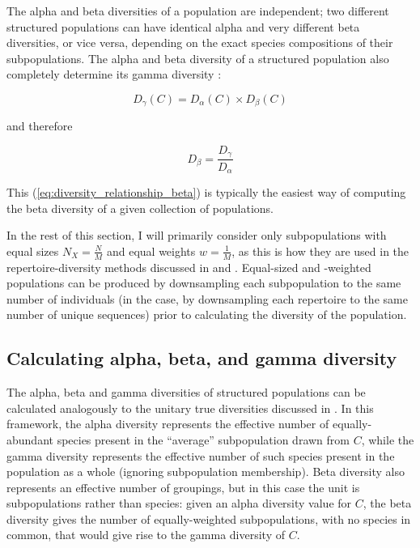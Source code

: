\noindent The alpha and beta diversities of a population are independent; two different structured populations can have identical alpha and very different beta diversities, or vice versa, depending on the exact species compositions of their subpopulations. The alpha and beta diversity of a structured population also completely determine its gamma diversity \citep{jost2007partitioning}:

\begin{equation}
D_\gamma(C) = D_\alpha(C) \times D_\beta(C)
\label{eq:diversity_relationship_gamma}
\end{equation}

\noindent and therefore 

\begin{equation}
D_\beta = \frac{D_\gamma}{D_\alpha}
\label{eq:diversity_relationship_beta}
\end{equation}

\noindent This (\autoref{eq:diversity_relationship_beta}) is typically the easiest way of computing the beta diversity of a given collection of populations.

In the rest of this section, I will primarily consider only subpopulations with equal sizes $N_X = \frac{N}{M}$ and equal weights $w = \frac{1}{M}$, as this is how they are used in the repertoire-diversity methods discussed in  and . Equal-sized and -weighted populations can be produced by downsampling each subpopulation to the same number of individuals (in the \igseq case, by downsampling each repertoire to the same number of unique sequences) prior to calculating the diversity of the population.
 
\subsection{Calculating alpha, beta, and gamma diversity}
\label{app:diversity-structured-calc}

The alpha, beta and gamma diversities of structured populations can be calculated analogously to the unitary true diversities discussed in . In this framework, the alpha diversity represents the effective number of equally-abundant species present in the ``average'' subpopulation drawn from $C$, while the gamma diversity represents the effective number of such species present in the population as a whole (ignoring subpopulation membership). Beta diversity also represents an effective number of groupings, but in this case the unit is subpopulations rather than species: given an alpha diversity value for $C$, the beta diversity gives the number of equally-weighted subpopulations, with no species in common, that would give rise to the gamma diversity of $C$.

